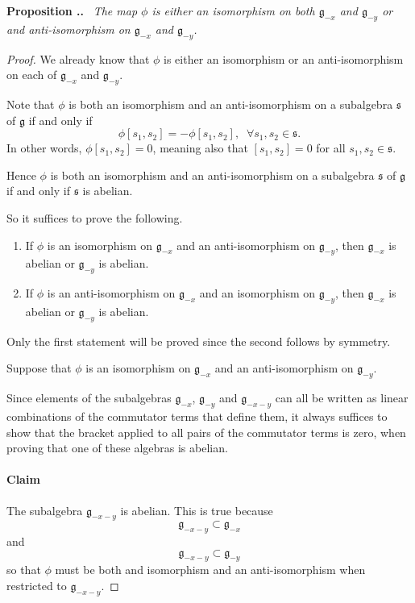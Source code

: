 \documentclass[honours]{UNSWthesis}
\newcommand{\g}{\mathfrak{g}}
\newcommand{\1}{\mathbf{e}_{1}}
\newcommand{\2}{\mathbf{e}_{3}}
\newcommand{\3}{\mathbf{e}_{3}}
\newcounter{Item}[section]
\newenvironment{Proposition}{\medskip
                            \refstepcounter{Item}
                            \noindent
                           {\bf Proposition \thesection.\theItem.}\ %
                            \begingroup \sl}
                           {\endgroup\medskip}
\begin{document}
\begin{Proposition}\label{consistency}
The map $\phi$ is either an isomorphism on both $\g_{-x}$ and $\g_{-y}$ or and anti-isomorphism on $\g_{-x}$ and $\g_{-y}$. 
\end{Proposition}

\begin{proof}
We already know that $\phi$ is either an isomorphism or an anti-isomorphism on each of $\g_{-x}$ and $\g_{-y}$. 

Note that $\phi$ is both an isomorphism and an anti-isomorphism on a subalgebra $\mathfrak{s}$ of $\g$ if and only if 
\[
\phi[s_1,s_2]=-\phi[s_1,s_2],\;\; \forall s_1,s_2 \in \mathfrak{s}.
\]
In other words, $\phi[s_1,s_2]=0$, meaning also that $[s_1,s_2]=0$ for all $s_1,s_2 \in \mathfrak{s}$. 

Hence $\phi$ is both an isomorphism and an anti-isomorphism on a subalgebra $\mathfrak{s}$ of $\g$ if and only if $\mathfrak{s}$ is abelian.

So it suffices to prove the following.
\begin{enumerate}
\item If $\phi$ is an isomorphism on $\g_{-x}$ and an anti-isomorphism on $\g_{-y}$, then $\g_{-x}$ is abelian or $\g_{-y}$ is abelian. 
\item If $\phi$ is an anti-isomorphism on $\g_{-x}$ and an isomorphism on $\g_{-y}$, then $\g_{-x}$ is abelian or $\g_{-y}$ is abelian.
\end{enumerate}

Only the first statement will be proved since the second follows by symmetry.

Suppose that $\phi$ is an isomorphism on $\g_{-x}$ and an anti-isomorphism on $\g_{-y}$.

Since elements of the subalgebras $\g_{-x}$, $\g_{-y}$ and $\g_{-x-y}$ can all be written as linear combinations of the commutator terms that define them, it always suffices to show that the bracket applied to all pairs of the commutator terms is zero, when proving that one of these algebras is abelian. 

\paragraph{Claim}
The subalgebra $\g_{-x-y}$ is abelian. This is true because
\[
\g_{-x-y} \subset \g_{-x}
\]
and 
\[
\g_{-x-y} \subset \g_{-y}
\]
so that $\phi$ must be both and isomorphism and an anti-isomorphism when restricted to $\g_{-x-y}$. 


\end{proof}
\end{document}
